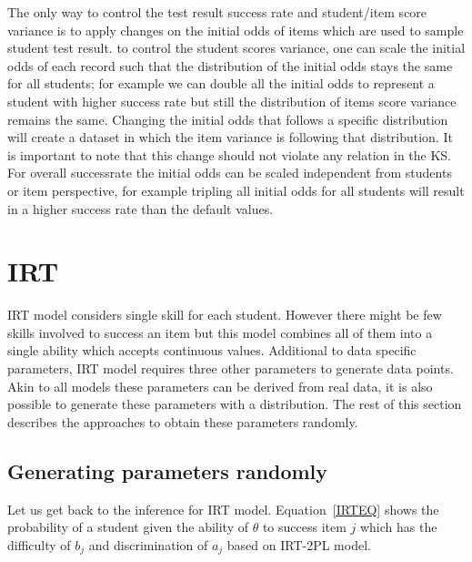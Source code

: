 The only way to control the test result success rate and student/item score variance is to apply changes on the initial odds of items which are used to sample student test result. to control the student scores variance, one can scale the initial odds of each record such that the distribution of the initial odds stays the same for all students; for example we can double all the initial odds to represent a student with higher success rate but still the distribution of items score variance remains the same. Changing the initial odds that follows a specific distribution will create a dataset in which the item variance is following that distribution. It is important to note that this change should not violate any relation in the KS. For overall successrate the initial odds can be scaled independent from students or item perspective, for example tripling all initial odds for all students will result in a higher success rate than the default values.





\section{IRT}

IRT model considers single skill for each student. However there might be few skills involved to success an item but this model combines all of them into a single ability which accepts continuous values. Additional to data specific parameters, IRT model requires three other parameters to generate data points. Akin to all models these parameters can be derived from real data, it is also possible to generate these parameters with a distribution. The rest of this section describes the approaches to obtain these parameters randomly.

\subsection{Generating parameters randomly}
Let us get back to the inference for IRT model. Equation~\ref{IRTEQ} shows the probability of a student given the ability of $\theta$ to success item $j$ which has the difficulty of $b_j$ and discrimination of $a_j$ based on IRT-2PL model. 

